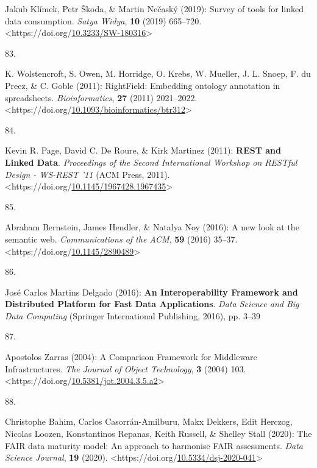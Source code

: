 \begin{thebibliography}{9}
Jakub Klímek, Petr Škoda, \& Martin Nečaský (2019): Survey of tools for
linked data consumption. \emph{Satya Widya}, \textbf{10} (2019)
665--720.
\textless https://doi.org/\href{https://doi.org/10.3233/SW-180316}{10.3233/SW-180316}\textgreater{}

\hypertarget{ref-wolstencroftRightFieldEmbeddingOntology2011b}{}
83.

K. Wolstencroft, S. Owen, M. Horridge, O. Krebs, W. Mueller, J. L.
Snoep, F. du Preez, \& C. Goble (2011): {RightField}: Embedding ontology
annotation in spreadsheets. \emph{Bioinformatics}, \textbf{27} (2011)
2021--2022.
\textless https://doi.org/\href{https://doi.org/10.1093/bioinformatics/btr312}{10.1093/bioinformatics/btr312}\textgreater{}

\hypertarget{ref-pageRESTLinkedData2011}{}
84.

Kevin R. Page, David C. De Roure, \& Kirk Martinez (2011):
\textbf{{REST} and {Linked Data}}. \emph{Proceedings of the {Second
International Workshop} on {RESTful Design} - {WS-REST} '11} ({ACM
Press}, 2011).
\textless https://doi.org/\href{https://doi.org/10.1145/1967428.1967435}{10.1145/1967428.1967435}\textgreater{}

\hypertarget{ref-bernsteinNewLookSemantic2016a}{}
85.

Abraham Bernstein, James Hendler, \& Natalya Noy (2016): A new look at
the semantic web. \emph{Communications of the ACM}, \textbf{59} (2016)
35--37.
\textless https://doi.org/\href{https://doi.org/10.1145/2890489}{10.1145/2890489}\textgreater{}

\hypertarget{ref-delgadoInteroperabilityFrameworkDistributed2016a}{}
86.

José Carlos Martins Delgado (2016): \textbf{An {Interoperability
Framework} and {Distributed Platform} for {Fast Data Applications}}.
\emph{Data {Science} and {Big Data Computing}} ({Springer International
Publishing}, 2016), pp. 3--39

\hypertarget{ref-zarrasComparisonFrameworkMiddleware2004a}{}
87.

Apostolos Zarras (2004): A {Comparison Framework} for {Middleware
Infrastructures}. \emph{The Journal of Object Technology}, \textbf{3}
(2004) 103.
\textless https://doi.org/\href{https://doi.org/10.5381/jot.2004.3.5.a2}{10.5381/jot.2004.3.5.a2}\textgreater{}

\hypertarget{ref-bahimFAIRDataMaturity2020a}{}
88.

Christophe Bahim, Carlos Casorrán-Amilburu, Makx Dekkers, Edit Herczog,
Nicolas Loozen, Konstantinos Repanas, Keith Russell, \& Shelley Stall
(2020): The {FAIR} data maturity model: {An} approach to harmonise
{FAIR} assessments. \emph{Data Science Journal}, \textbf{19} (2020).
\textless https://doi.org/\href{https://doi.org/10.5334/dsj-2020-041}{10.5334/dsj-2020-041}\textgreater{}


\end{thebibliography}
